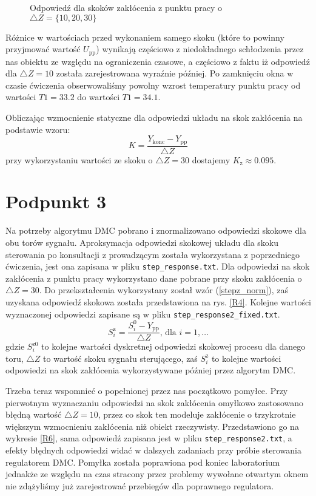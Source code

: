 \begin{figure}[ht]
\centering

\caption{Odpowiedź dla skoków zakłócenia z punktu pracy o $\triangle Z = \{10, 20, 30\}$}
\label{R2}
\end{figure}

Różnice w wartościach przed wykonaniem samego skoku (które to powinny przyjmować wartość $U_{\mathrm{pp}}$) wynikają częściowo z niedokładnego schłodzenia przez nas obiektu ze względu na ograniczenia czasowe, a częściowo z faktu iż odpowiedź dla $\triangle Z=10$ została zarejestrowana wyraźnie później. Po zamknięciu okna w czasie ćwiczenia obserwowaliśmy powolny wzrost temperatury punktu pracy od wartości $T1=\num{33,2}$ do wartości $T1=\num{34,1}$.

Obliczając wzmocnienie statyczne dla odpowiedzi układu na skok zakłócenia na podstawie wzoru:
\begin{equation}
K=\frac{Y_{\mathrm{konc}}-Y_{\mathrm{pp}}}{\triangle Z}
\end{equation}
przy wykorzystaniu wartości ze skoku o $ \triangle Z = 30 $ dostajemy $K_{\mathrm{z}} \approx \num{0.095}$.


\chapter{Podpunkt 3}
Na potrzeby algorytmu DMC pobrano i znormalizowano odpowiedzi skokowe dla obu torów sygnału. Aproksymacja odpowiedzi skokowej układu dla skoku sterowania po konsultacji z prowadzącym została wykorzystana z poprzedniego ćwiczenia, jest ona zapisana w pliku \verb|step_response.txt|. Dla odpowiedzi na skok zakłócenia z punktu pracy wykorzystano dane pobrane przy skoku zakłócenia o $\triangle Z = 30$. Do przekształcenia wykorzystany został wzór (\ref{stepz_norm}), zaś uzyskana odpowiedź skokowa została przedstawiona na rys. \ref{R4}. Kolejne wartości wyznaczonej odpowiedzi zapisane są w pliku \verb+step_response2_fixed.txt+.
\begin{equation}
S_i^{\mathrm{z}} = \frac{S_i^0 - Y_{\mathrm{pp}}}{\triangle Z} \textrm{, dla } i=1,\ldots
\label{stepz_norm}
\end{equation}
gdzie $S_i^{\mathrm{z}0}$ to kolejne wartości dyskretnej odpowiedzi skokowej procesu dla danego toru, $\triangle Z$ to wartość skoku sygnału sterującego, zaś $S_i^{\mathrm{z}}$ to kolejne wartości odpowiedzi na skok zakłócenia wykorzystywane później przez algorytm DMC.

Trzeba teraz wspomnieć o popełnionej przez nas początkowo pomyłce. Przy pierwotnym wyznaczaniu odpowiedzi na skok zakłócenia omyłkowo zastosowano błędną wartość $ \triangle Z = 10 $, przez co skok ten modeluje zakłócenie o trzykrotnie większym wzmocnieniu zakłócenia niż obiekt rzeczywisty. Przedstawiono go na wykresie \ref{R6}, sama odpowiedź zapisana jest w pliku \verb|step_response2.txt|, a efekty błędnych odpowiedzi widać w dalszych zadaniach przy próbie sterowania regulatorem DMC. Pomyłka została poprawiona pod koniec laboratorium jednakże ze względu na czas stracony przez problemy wywołane otwartym oknem nie zdążyliśmy już zarejestrować przebiegów dla poprawnego regulatora.

